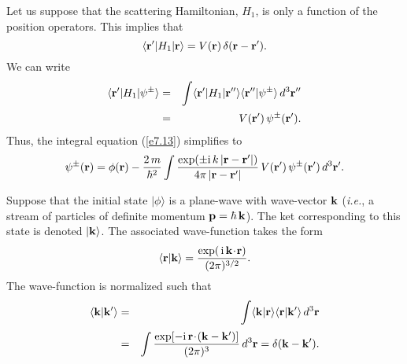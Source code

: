 Let us suppose that the scattering Hamiltonian, $H_1$, is only a function
of the position operators. This implies that
\begin{equation}\label{e7.15}
\langle {\bf r}'|H_1|{\bf r}\rangle = V({\bf r})\, \delta({\bf r} -{\bf r}').
\end{equation}
 We can write
\begin{eqnarray}
\langle {\bf r}'|H_1| \psi^\pm\rangle& =& \int \langle
{\bf r}'|H_1|{\bf r}''\rangle \langle {\bf r}'' |\psi^\pm\rangle\,
d^3{\bf r}''\nonumber\\[0.5ex]
&=& V({\bf r}') \,\psi^\pm ({\bf r}').
\end{eqnarray}
Thus, the integral equation (\ref{e7.13}) simplifies to
\begin{equation}\label{e7.17}
\psi^\pm({\bf r}) = \phi({\bf r}) - \frac{2\,m}{\hbar^2} \int\frac{\exp(\pm {\rm i}\,k\,
|{\bf r} - {\bf r}'|)}{4\pi\,|{\bf r} - {\bf r}'|}\, V({\bf r}')\,
\psi^\pm({\bf r'})\,d^3{\bf r}'.
\end{equation}

Suppose that the initial state $|\phi\rangle$ is a plane-wave with  wave-vector  ${\bf k}$ ({\em i.e.}, a stream of particles of
definite momentum ${\bf p} = \hbar \,{\bf k}$). The ket corresponding to
this  state is denoted $|{\bf k}\rangle$. The associated wave-function 
takes the form 
\begin{equation}
\langle {\bf r} | {\bf k}\rangle = \frac{
\exp(\,{\rm i}\,{\bf k}\!\cdot\!{\bf r}) }{(2\pi)^{3/2}}.
\end{equation}
The wave-function is normalized such that
\begin{eqnarray}
\langle {\bf k}|{\bf k}'\rangle &=& \int \langle {\bf k}|{\bf r}\rangle
\langle {\bf r} |{\bf k}'\rangle\,d^3{\bf r}\nonumber\\[0.5ex]
&=& \int \frac{ \exp[-{\rm i}\, {\bf r}\!\cdot\!({\bf k} -{\bf k}')]}
{(2\pi )^3}\, d^3{\bf r} = \delta ({\bf k} - {\bf k'}).
\end{eqnarray}

